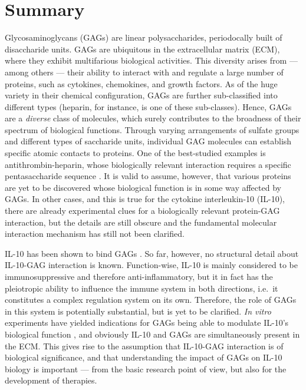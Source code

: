 
\vspace{-0.5cm}

\chapter{Summary}



Glycosaminoglycans (GAGs) are linear polysaccharides, periodocally built of
disaccharide units. GAGs are ubiquitous in the extracellular matrix (ECM), where
they exhibit multifarious biological activities. This diversity arises from ---
among others --- their ability to interact with and regulate a large number of
proteins, such as cytokines, chemokines, and growth factors. As of the huge
variety in their chemical configuration, GAGs are further sub-classified into
different types (heparin, for instance, is one of these sub-classes). Hence,
GAGs are a \textit{diverse} class of molecules, which surely contributes to the
broadness of their spectrum of biological functions. Through varying
arrangements of sulfate groups and different types of saccharide units,
individual GAG molecules can establish specific atomic contacts to proteins. One
of the best-studied examples is antithrombin-heparin, whose biologically
relevant interaction requires a specific pentasaccharide sequence
\cite{antithrombin-thrombin-heparin-2004}. It is valid to assume, however, that
various proteins are yet to be discovered whose biological function is in some
way affected by GAGs. In other cases, and this is true for the cytokine
interleukin-10 (IL-10), there are already experimental clues for a biologically
relevant protein-GAG interaction, but the details are still obscure and the
fundamental molecular interaction mechanism has still not been clarified.

IL-10 has been shown to bind GAGs \cite{salek_ardakani_2000}. So far, however,
no structural detail about IL-10-GAG interaction is known. Function-wise, IL-10
is mainly considered to be immunosuppressive and therefore anti-inflammatory,
but it in fact has the pleiotropic ability to influence the immune system in
both directions, i.e.\ it constitutes a complex regulation system on its own.
Therefore, the role of GAGs in this system is potentially substantial, but is
yet to be clarified. \textit{In vitro} experiments have yielded indications for
GAGs being able to modulate IL-10's biological function
\cite{salek_ardakani_2000}, and obviously IL-10 and GAGs are simultaneously
present in the ECM. This gives rise to the assumption that IL-10-GAG interaction
is of biological significance, and that understanding the impact of GAGs on
IL-10 biology is important --- from the basic research point of view, but also
for the development of therapies.

